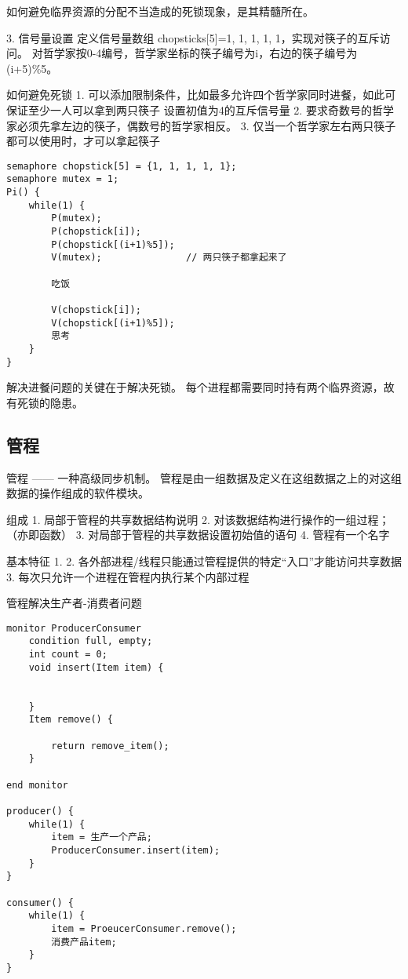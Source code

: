 如何避免临界资源的分配不当造成的死锁现象，是其精髓所在。

3. 信号量设置
定义信号量数组 chopsticks[5]={1, 1, 1, 1, 1}，实现对筷子的互斥访问。
对哲学家按0-4编号，哲学家坐标的筷子编号为i，右边的筷子编号为(i+5)\%5。


如何避免死锁
1. 可以添加限制条件，比如最多允许四个哲学家同时进餐，如此可保证至少一人可以拿到两只筷子
	设置初值为4的互斥信号量
2. 要求奇数号的哲学家必须先拿左边的筷子，偶数号的哲学家相反。
3. 仅当一个哲学家左右两只筷子都可以使用时，才可以拿起筷子
\begin{lstlisting}
semaphore chopstick[5] = {1, 1, 1, 1, 1};
semaphore mutex = 1;
Pi() {
	while(1) {
		P(mutex);
		P(chopstick[i]);
		P(chopstick[(i+1)%5]);
		V(mutex);				// 两只筷子都拿起来了
		
		吃饭
		
		V(chopstick[i]);
		V(chopstick[(i+1)%5]);
		思考
	}
}
\end{lstlisting}

解决进餐问题的关键在于解决死锁。
每个进程都需要同时持有两个临界资源，故有死锁的隐患。

\subsection{管程}
管程 —— 一种高级同步机制。
管程是由一组数据及定义在这组数据之上的对这组数据的操作组成的软件模块。

组成
1. 局部于管程的共享数据结构说明
2. 对该数据结构进行操作的一组过程；（亦即函数）
3. 对局部于管程的共享数据设置初始值的语句
4. 管程有一个名字

基本特征
1. 
2. 各外部进程/线程只能通过管程提供的特定“入口”才能访问共享数据
3. 每次只允许一个进程在管程内执行某个内部过程



管程解决生产者-消费者问题
\begin{lstlisting}
monitor ProducerConsumer
	condition full, empty;
	int count = 0;
	void insert(Item item) {
		
		
	}
	Item remove() {
	
		return remove_item();
	}

end monitor

producer() {
	while(1) {
		item = 生产一个产品;
		ProducerConsumer.insert(item);
	}
}

consumer() {
	while(1) {
		item = ProeucerConsumer.remove();
		消费产品item;
	}
}
\end{lstlisting}

